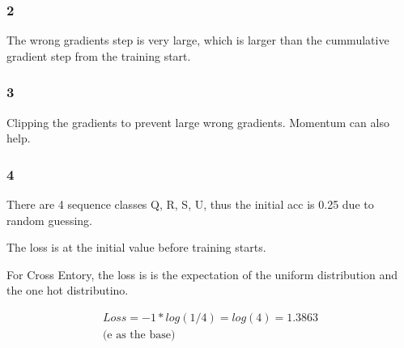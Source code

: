 \subsubsection*{2}
The wrong gradients step is very large, which is larger than the cummulative gradient step from the training start.
\subsubsection*{3}
Clipping the gradients to prevent large wrong gradients. Momentum can also help.

\subsubsection*{4}
There are 4 sequence classes Q, R, S, U, thus the initial acc is 0.25 due to random guessing.

The loss is at the initial value before training starts.

For Cross Entory, the loss is is the expectation of the uniform distribution and the one hot distributino.

\begin{align}
    Loss  =  - 1 * log(1/4)
          =  log(4)
          =  1.3863 \\ \text{(e as the base)}
\end{align}
